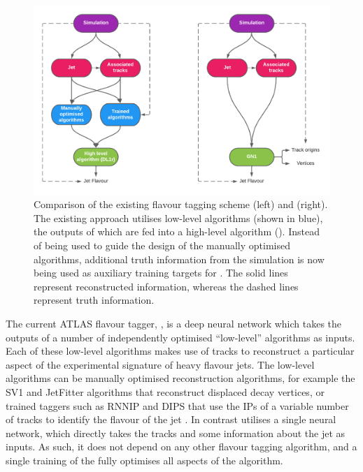 \begin{figure}[!htbp]
    \centering
    \includegraphics[width=0.8\linewidth]{chapters/gnn_tagger/figs/GNN_compare_contrast.pdf}
    \caption{Comparison of the existing flavour tagging scheme (left) and \GNN (right). The existing approach utilises low-level algorithms (shown in blue), the outputs of which are fed into a high-level algorithm (\DLr). Instead of being used to guide the design of the manually optimised algorithms, additional truth information from the simulation is now being used as auxiliary training targets for \GNN. The solid lines represent reconstructed information, whereas the dashed lines represent truth information.}
    \label{fig:oldvsnew}
\end{figure}

The current ATLAS flavour tagger, \DLr \cite{ATL-PHYS-PUB-2017-013}, is a deep neural network which takes the outputs of a number of independently optimised ``low-level'' algorithms \cite{FTAG-2018-01} as inputs. 
Each of these low-level algorithms makes use of tracks to reconstruct a particular aspect of the experimental signature of heavy flavour jets.
The low-level algorithms can be manually optimised reconstruction algorithms, for example the SV1 and JetFitter algorithms that reconstruct displaced decay vertices, or trained taggers such as RNNIP and DIPS that use the IPs of a variable number of tracks to identify the flavour of the jet \cite{FTAG-2018-01,ATL-PHYS-PUB-2017-011,ATL-PHYS-PUB-2017-003,ATL-PHYS-PUB-2020-014}.
In contrast \GNN utilises a single neural network, which directly takes the tracks and some information about the jet as inputs. As such, it does not depend on any other flavour tagging algorithm, and a single training of the \GNN fully optimises all aspects of the algorithm.  

